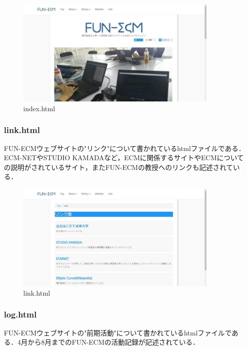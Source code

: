 \documentclass[openany,11pt,papersize]{jsbook}
\begin{document}
\begin{figure}[H]
  \begin{center} %
    \includegraphics[clip, width=10.0cm]{./figure/index.png}
    \caption{index.html} %
    \label{index} %
  \end{center}
\end{figure}

\subsubsection{link.html}
FUN-ECMウェブサイトの"リンク"について書かれているhtmlファイルである．ECM-NETやSTUDIO KAMADAなど，ECMに関係するサイトやECMについての説明がされているサイト，またFUN-ECMの教授へのリンクも記述されている．

\begin{figure}[H]
  \begin{center} %
    \includegraphics[clip, width=10.0cm]{./figure/link.png}
    \caption{link.html} %
    \label{link} %
  \end{center}
\end{figure}

\subsubsection{log.html}
FUN-ECMウェブサイトの"前期活動"について書かれているhtmlファイルである．4月から8月までのFUN-ECMの活動記録が記述されている．
\end{document}
